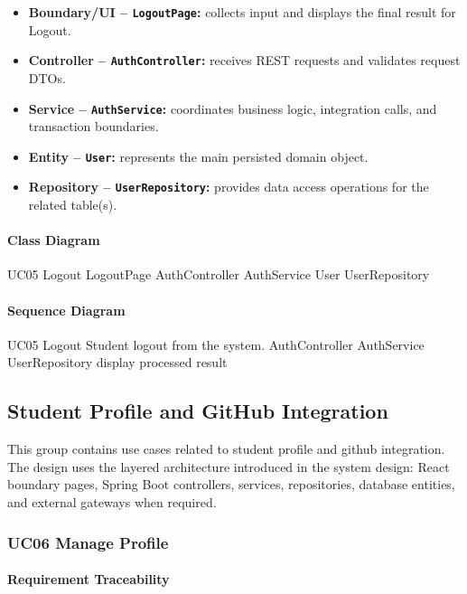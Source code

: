 \begin{itemize}
    \item \textbf{Boundary/UI -- \texttt{LogoutPage}:} collects input and displays the final result for Logout.
    \item \textbf{Controller -- \texttt{AuthController}:} receives REST requests and validates request DTOs.
    \item \textbf{Service -- \texttt{AuthService}:} coordinates business logic, integration calls, and transaction boundaries.
    \item \textbf{Entity -- \texttt{User}:} represents the main persisted domain object.
    \item \textbf{Repository -- \texttt{UserRepository}:} provides data access operations for the related table(s).
\end{itemize}

\paragraph{Class Diagram}

\ClassDiagram
{UC05 Logout}
{LogoutPage}
{AuthController}
{AuthService}
{User}
{UserRepository}

\paragraph{Sequence Diagram}

\SequenceDiagram
{UC05 Logout}
{Student}
{logout from the system.}
{AuthController}
{AuthService}
{UserRepository}
{display processed result}

\subsection{Student Profile and GitHub Integration}

This group contains use cases related to student profile and github integration. The design uses the layered architecture introduced in the system design: React boundary pages, Spring Boot controllers, services, repositories, database entities, and external gateways when required.

\subsubsection{UC06 Manage Profile}

\paragraph{Requirement Traceability}

